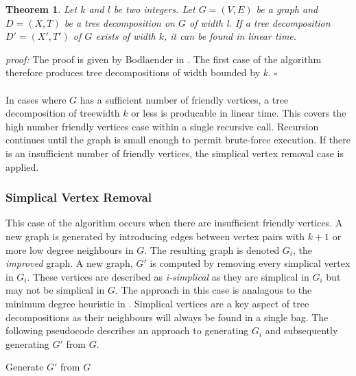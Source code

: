\documentclass[12pt,conference]{IEEEtran}
\theoremstyle{plain}
\newtheorem{theorem}{Theorem}
\begin{document}
\begin{theorem}
  Let $k$ and $l$ be two integers. Let $G=(V,E)$ be a graph and $D=(X,T)$ be a tree decomposition on $G$ of width l. If a tree decomposition $D'=(X',T')$ of $G$ exists of width $k$, it can be found in linear time.
\end{theorem}

\textit{proof:} The proof is given by Bodlaender in \cite{treewidth-value-reduction}. The first case of the algorithm therefore produces tree decompositions of width bounded by $k$. $\square$
\\
\\
In cases where $G$ has a sufficient number of friendly vertices, a tree decomposition of treewidth $k$ or less is producable in linear time. This covers the high number friendly vertices case within a single recursive call. Recursion continues until the graph is small enough to permit brute-force execution. If there is an insufficient number of friendly vertices, the simplical vertex removal case is applied.

\subsubsection{Simplical Vertex Removal}

This case of the algorithm occurs when there are insufficient friendly vertices. A new graph is generated by introducing edges between vertex pairs with $k+1$ or more low degree neighbours in $G$. The resulting graph is denoted $G_{i}$, the \textit{improved} graph. A new graph, $G'$ is computed by removing every simplical vertex in $G_{i}$. These vertices are described as \textit{i-simplical} as they are simplical in $G_{i}$ but may not be simplical in $G$. The approach in this case is analagous to the minimum degree heuristic in \cite{min-degree-upper-bound}. Simplical vertices are a key aspect of tree decompositions as their neighbours will always be found in a single bag. The following pseudocode describes an approach to generating $G_{i}$ and subsequently generating $G'$ from $G$.

\begin{algorithm}[H]
  \caption{Generate $G'$ from $G$}
  \label{improved_graph_generate}
  \begin{algorithmic}[1]
    \EndIf
  \EndFor
  \EndFor
  \EndProcedure
\State{}
      \EndIf
  \EndFor
  \EndProcedure
\State{}

      \EndIf
    \EndFor
  \EndFor
  \EndProcedure
  \end{algorithmic}
\end{algorithm}
\end{document}
